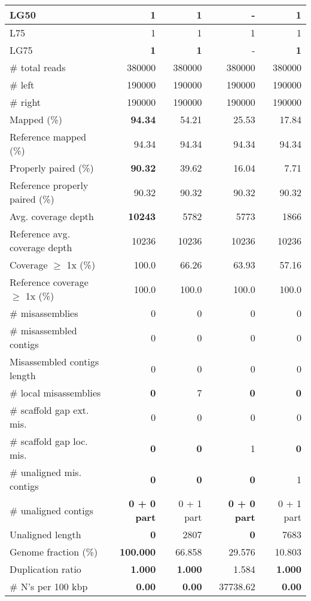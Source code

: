 \documentclass[12pt,a4paper]{article}
\begin{document}
\begin{table}[ht]
\begin{center}
\begin{tabular}{|l*{4}{|r}|}
LG50 & {\bf 1} & {\bf 1} & - & {\bf 1} \\ \hline
L75 & 1 & 1 & 1 & 1 \\ \hline
LG75 & {\bf 1} & {\bf 1} & - & {\bf 1} \\ \hline
\# total reads & 380000 & 380000 & 380000 & 380000 \\ \hline
\# left & 190000 & 190000 & 190000 & 190000 \\ \hline
\# right & 190000 & 190000 & 190000 & 190000 \\ \hline
Mapped (\%) & {\bf 94.34} & 54.21 & 25.53 & 17.84 \\ \hline
Reference mapped (\%) & 94.34 & 94.34 & 94.34 & 94.34 \\ \hline
Properly paired (\%) & {\bf 90.32} & 39.62 & 16.04 & 7.71 \\ \hline
Reference properly paired (\%) & 90.32 & 90.32 & 90.32 & 90.32 \\ \hline
Avg. coverage depth & {\bf 10243} & 5782 & 5773 & 1866 \\ \hline
Reference avg. coverage depth & 10236 & 10236 & 10236 & 10236 \\ \hline
Coverage $\geq$ 1x (\%) & 100.0 & 66.26 & 63.93 & 57.16 \\ \hline
Reference coverage $\geq$ 1x (\%) & 100.0 & 100.0 & 100.0 & 100.0 \\ \hline
\# misassemblies & 0 & 0 & 0 & 0 \\ \hline
\# misassembled contigs & 0 & 0 & 0 & 0 \\ \hline
Misassembled contigs length & 0 & 0 & 0 & 0 \\ \hline
\# local misassemblies & {\bf 0} & 7 & {\bf 0} & {\bf 0} \\ \hline
\# scaffold gap ext. mis. & 0 & 0 & 0 & 0 \\ \hline
\# scaffold gap loc. mis. & {\bf 0} & {\bf 0} & 1 & {\bf 0} \\ \hline
\# unaligned mis. contigs & {\bf 0} & {\bf 0} & {\bf 0} & 1 \\ \hline
\# unaligned contigs & {\bf 0 + 0 part} & 0 + 1 part & {\bf 0 + 0 part} & 0 + 1 part \\ \hline
Unaligned length & {\bf 0} & 2807 & {\bf 0} & 7683 \\ \hline
Genome fraction (\%) & {\bf 100.000} & 66.858 & 29.576 & 10.803 \\ \hline
Duplication ratio & {\bf 1.000} & {\bf 1.000} & 1.584 & {\bf 1.000} \\ \hline
\# N's per 100 kbp & {\bf 0.00} & {\bf 0.00} & 37738.62 & {\bf 0.00} \\ \hline

\end{tabular}
\end{center}
\end{table}
\end{document}
